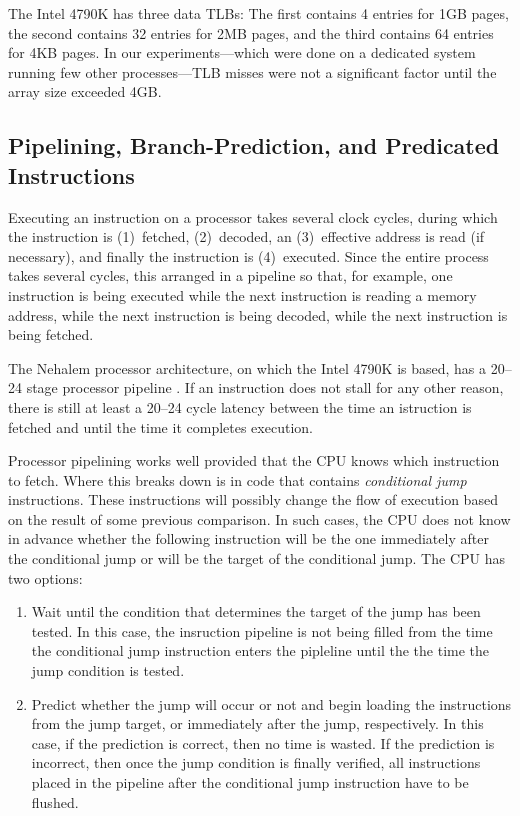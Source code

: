 \documentclass{patmorin}
\begin{document}
The Intel 4790K has three data TLBs: The first contains 4 entries for
1GB pages, the second contains 32 entries for 2MB pages, and the third
contains 64 entries for 4KB pages.  In our experiments---which were done
on a dedicated system running few other processes---TLB misses were not
a significant factor until the array size exceeded 4GB.


\subsection{Pipelining, Branch-Prediction, and Predicated Instructions}

Executing an instruction on a processor takes several clock cycles, during
which the instruction is (1)~fetched, (2)~decoded, an (3)~effective
address is read (if necessary), and finally the instruction is
(4)~executed.  Since the entire process takes several cycles, this
arranged in a pipeline so that, for example, one instruction is being
executed while the next instruction is reading a memory address, while
the next instruction is being decoded, while the next instruction is
being fetched.

The Nehalem processor architecture, on which the Intel 4790K is based, has
a 20--24 stage processor pipeline \cite{bit-tech:intel}. If an instruction
does not stall for any other reason, there is still at least a 20--24
cycle latency between the time an istruction is fetched and until the
time it completes execution.

Processor pipelining works well provided that the CPU knows which
instruction to fetch.  Where this breaks down is in code that contains
\emph{conditional jump} instructions. These instructions will possibly
change the flow of execution based on the result of some previous
comparison.  In such cases, the CPU does not know in advance whether the
following instruction will be the one immediately after the conditional
jump or will be the target of the conditional jump. The CPU has two
options:
\begin{enumerate}
  \item Wait until the condition that determines the target
   of the jump has been tested. In this case, the insruction pipeline
   is not being filled from the time the conditional jump instruction
   enters the pipleline until the the time the jump condition is tested.

  \item Predict whether the jump will occur or not and begin loading
  the instructions from the jump target, or immediately after the jump,
  respectively.  In this case, if the prediction is correct, then no
  time is wasted. If the prediction is incorrect, then once the jump
  condition is finally verified, all instructions placed in the pipeline
  after the conditional jump instruction have to be flushed.
\end{enumerate}
\end{document}
